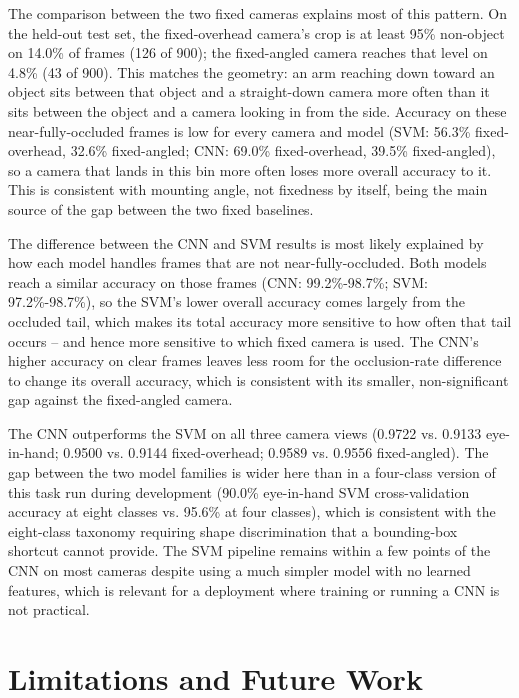 \documentclass[conference]{IEEEtran}
\begin{document}
The comparison between the two fixed cameras explains most of this pattern. On the held-out test set, the fixed-overhead camera's crop is at least 95\% non-object on 14.0\% of frames (126 of 900); the fixed-angled camera reaches that level on 4.8\% (43 of 900). This matches the geometry: an arm reaching down toward an object sits between that object and a straight-down camera more often than it sits between the object and a camera looking in from the side. Accuracy on these near-fully-occluded frames is low for every camera and model (SVM: 56.3\% fixed-overhead, 32.6\% fixed-angled; CNN: 69.0\% fixed-overhead, 39.5\% fixed-angled), so a camera that lands in this bin more often loses more overall accuracy to it. This is consistent with mounting angle, not fixedness by itself, being the main source of the gap between the two fixed baselines.

The difference between the CNN and SVM results is most likely explained by how each model handles frames that are not near-fully-occluded. Both models reach a similar accuracy on those frames (CNN: 99.2\%-98.7\%; SVM: 97.2\%-98.7\%), so the SVM's lower overall accuracy comes largely from the occluded tail, which makes its total accuracy more sensitive to how often that tail occurs -- and hence more sensitive to which fixed camera is used. The CNN's higher accuracy on clear frames leaves less room for the occlusion-rate difference to change its overall accuracy, which is consistent with its smaller, non-significant gap against the fixed-angled camera.

The CNN outperforms the SVM on all three camera views (0.9722 vs. 0.9133 eye-in-hand; 0.9500 vs. 0.9144 fixed-overhead; 0.9589 vs. 0.9556 fixed-angled). The gap between the two model families is wider here than in a four-class version of this task run during development (90.0\% eye-in-hand SVM cross-validation accuracy at eight classes vs. 95.6\% at four classes), which is consistent with the eight-class taxonomy requiring shape discrimination that a bounding-box shortcut cannot provide. The SVM pipeline remains within a few points of the CNN on most cameras despite using a much simpler model with no learned features, which is relevant for a deployment where training or running a CNN is not practical.

\section{Limitations and Future Work}
\end{document}
